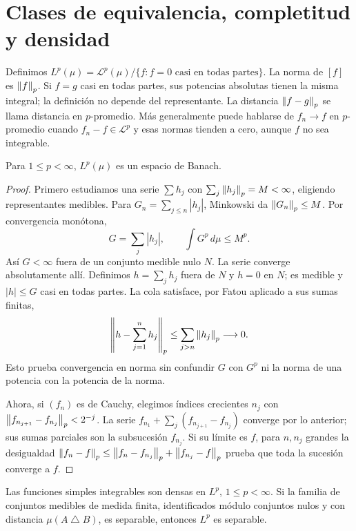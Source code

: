 \section{Clases de equivalencia, completitud y densidad}\label{lectura:v2-19}
\begin{definicion}
Definimos $L^p(\mu)=\mathcal L^p(\mu)/\{f:f=0\text{ casi en todas partes}\}$. La norma de $[f]$ es $\left\lVert f\right\rVert_p$. Si $f=g$ casi en todas partes, sus potencias absolutas tienen la misma integral; la definición no depende del representante. La distancia $\left\lVert f-g\right\rVert_p$ se llama distancia en $p$-promedio. Más generalmente puede hablarse de $f_n\to f$ en $p$-promedio cuando $f_n-f\in\mathcal L^p$ y esas normas tienden a cero, aunque $f$ no sea integrable.
\end{definicion}
\begin{teorema}[Completitud de $L^p$]\label{v2:lp-completo}
Para $1\le p<\infty$, $L^p(\mu)$ es un espacio de Banach.
\end{teorema}
\begin{proof}
Primero estudiamos una serie $\sum h_j$ con $\sum_j\left\lVert h_j\right\rVert_p=M<\infty$, eligiendo representantes medibles. Para $G_n=\sum_{j\le n}|h_j|$, Minkowski da $\left\lVert G_n\right\rVert_p\le M$. Por convergencia monótona,
\[
 G=\sum_j|h_j|,\qquad \int G^p\,d\mu\le M^p.
\]
Así $G<\infty$ fuera de un conjunto medible nulo $N$. La serie converge absolutamente allí. Definimos $h=\sum_jh_j$ fuera de $N$ y $h=0$ en $N$; es medible y $|h|\le G$ casi en todas partes. La cola satisface, por Fatou aplicado a sus sumas finitas,
\[
 \left\|h-\sum_{j=1}^n h_j\right\|_p\le\sum_{j>n}\left\lVert h_j\right\rVert_p\longrightarrow0.
\]
Esto prueba convergencia en norma sin confundir $G$ con $G^p$ ni la norma de una potencia con la potencia de la norma.

Ahora, si $(f_n)$ es de Cauchy, elegimos índices crecientes $n_j$ con $\left\lVert f_{n_{j+1}}-f_{n_j}\right\rVert_p<2^{-j}$. La serie $f_{n_1}+\sum_j(f_{n_{j+1}}-f_{n_j})$ converge por lo anterior; sus sumas parciales son la subsucesión $f_{n_j}$. Si su límite es $f$, para $n,n_j$ grandes la desigualdad $\left\lVert f_n-f\right\rVert_p\le\left\lVert f_n-f_{n_j}\right\rVert_p+\left\lVert f_{n_j}-f\right\rVert_p$ prueba que toda la sucesión converge a $f$.
\end{proof}
\begin{teorema}\label{v2:lp-densidad}
Las funciones simples integrables son densas en $L^p$, $1\le p<\infty$. Si la familia de conjuntos medibles de medida finita, identificados módulo conjuntos nulos y con distancia $\mu(A\mathbin\triangle B)$, es separable, entonces $L^p$ es separable.
\end{teorema}
